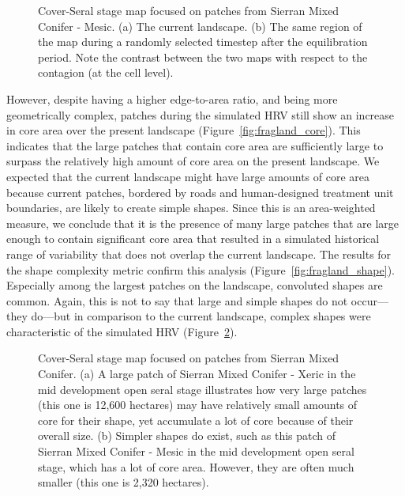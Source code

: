 \begin{figure}[!htbp]
  \centering
  \caption{Cover-Seral stage map focused on patches from Sierran Mixed Conifer - Mesic. (a) The current landscape. (b) The same region of the map during a randomly selected timestep after the equilibration period. Note the contrast between the two maps with respect to the contagion (at the cell level).} 
  \label{fig:patchmaps3} %
\end{figure}

However, despite having a higher edge-to-area ratio, and being more geometrically complex, patches during the simulated HRV still show an increase in core area over the present landscape (Figure~\ref{fig:fragland_core}). This indicates that the large patches that contain core area are sufficiently large to surpass the relatively high amount of core area on the present landscape. We expected that the current landscape might have large amounts of core area because current patches, bordered by roads and human-designed treatment unit boundaries, are likely to create simple shapes. Since this is an area-weighted measure, we conclude that it is the presence of many large patches that are large enough to contain significant core area that resulted in a simulated historical range of variability that does not overlap the current landscape. The results for the shape complexity metric confirm this analysis (Figure~\ref{fig:fragland_shape}). Especially among the largest patches on the landscape, convoluted shapes are common. Again, this is not to say that large and simple shapes do not occur---they do---but in comparison to the current landscape, complex shapes were characteristic of the simulated HRV (Figure~\ref{fig:patchmaps4}).

\begin{figure}[!htbp]
  \centering
  \caption{Cover-Seral stage map focused on patches from Sierran Mixed Conifer. (a) A large patch of Sierran Mixed Conifer - Xeric in the mid development open seral stage illustrates how very large patches (this one is 12,600 hectares) may have relatively small amounts of core for their shape, yet accumulate a lot of core because of their overall size. (b) Simpler shapes do exist, such as this patch of Sierran Mixed Conifer - Mesic in the mid development open seral stage, which has a lot of core area. However, they are often much smaller (this one is 2,320 hectares).}
  \label{fig:patchmaps4}
\end{figure}

